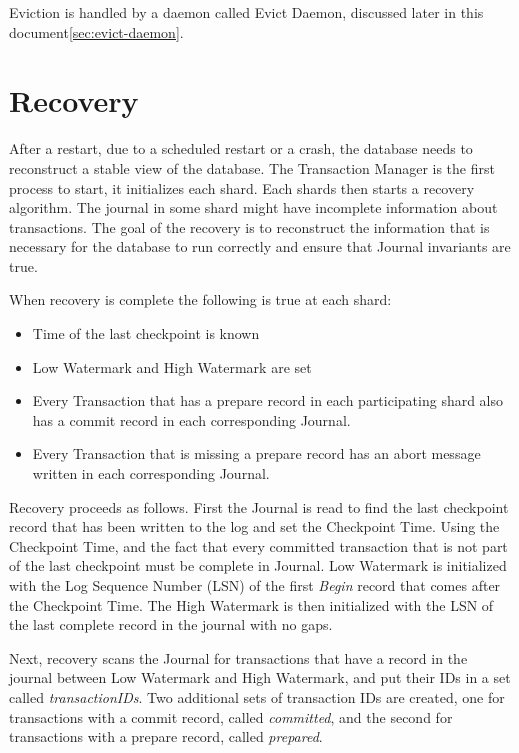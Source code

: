 \documentclass[twoside]{article}
\begin{document}
Eviction is handled by a daemon called Evict Daemon, discussed later in this
document\ref{sec:evict-daemon}.

\section{Recovery}
\label{sec:recovery}

After a restart, due to a scheduled restart or a crash, the database needs to 
reconstruct a stable view of the database. 
The Transaction Manager is the first process to start, it initializes each shard.
Each shards then starts a recovery algorithm.
The journal in some shard might have incomplete information 
about transactions. 
The goal of the recovery is to reconstruct the information
that is necessary for the database to run correctly and ensure that Journal 
invariants are true.


When recovery is complete the following is true at each shard:
\begin{itemize}
  \item Time of the last checkpoint is known
  \item Low Watermark and High Watermark are set
  \item Every Transaction that has a prepare record in each participating shard also
  has a commit record in each corresponding Journal.
  \item Every Transaction that is missing a prepare record has an abort message 
  written in each corresponding Journal.
\end{itemize}

Recovery proceeds as follows. 
First the Journal is read to find the last checkpoint record that has been written
to the log and set the Checkpoint Time.
Using the Checkpoint Time, and the fact that every committed transaction that is 
not part of the last checkpoint must be complete in Journal.
Low Watermark is initialized with the Log Sequence Number (LSN) of the first 
\textit{Begin} record that comes after the Checkpoint Time. 
The High Watermark is then initialized with the LSN of the last complete 
record in the journal with no gaps.

Next, recovery scans the Journal for transactions that have a record in the
journal between Low Watermark and High Watermark, and put their IDs in a set
called \textit{transactionIDs}.
Two additional sets of transaction IDs are created, one for transactions with
a commit record, called \textit{committed}, and the second for transactions with
a prepare record, called \textit{prepared}.
\end{document}
